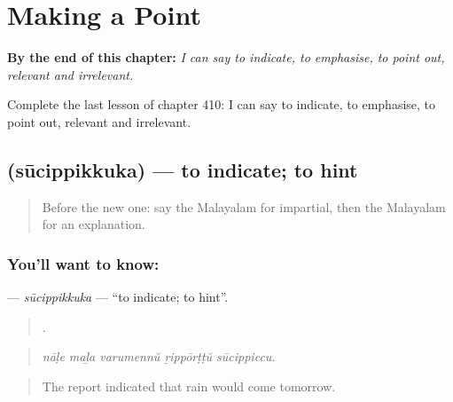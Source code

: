 
\chapter{Making a Point}
\label{ch:ml-making-a-point}

\begin{chapteropening}
\textbf{By the end of this chapter:} \emph{I can say to indicate, to emphasise, to point out, relevant and irrelevant.}

Complete the last lesson of chapter 410: I can say to indicate, to emphasise, to point out, relevant and irrelevant.
\end{chapteropening}

\section[\texorpdfstring{\ml{സൂചിപ്പിക്കുക} (sūcippikkuka)}{സൂചിപ്പിക്കുക (sūcippikkuka)}]{ (sūcippikkuka) — to indicate; to hint}

\label{lesson:ML-C410-sucippikkuka}



\begin{quote}
Before the new one: say the Malayalam for impartial, then the Malayalam for an explanation.
\end{quote}

\subsection*{You'll want to know: }
\textbf{} — \emph{sūcippikkuka} — \textquotedblleft{}to indicate; to hint\textquotedblright{}.

\begin{quote}
    .
\end{quote}

\begin{quote}
\emph{nāḷe maḻa varumennŭ ṟippōrṭṭŭ sūcippiccu.}
\end{quote}

\begin{quote}
The report indicated that rain would come tomorrow.
\end{quote}

